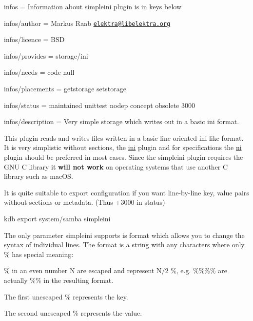 
\begin{DoxyItemize}
\item infos = Information about simpleini plugin is in keys below
\item infos/author = Markus Raab \href{mailto:elektra@libelektra.org}{\tt elektra@libelektra.\+org}
\item infos/licence = B\+SD
\item infos/provides = storage/ini
\item infos/needs = code null
\item infos/placements = getstorage setstorage
\item infos/status = maintained unittest nodep concept obsolete 3000
\item infos/description = Very simple storage which writes out in a basic ini format.
\end{DoxyItemize}

This plugin reads and writes files written in a basic line-\/oriented ini-\/like format. It is very simplistic without sections, the \hyperlink{autotoc_md289_src_plugins_ini_README_md}{ini} plugin and for specifications the \hyperlink{autotoc_md502_src_plugins_ni_README_md}{ni} plugin should be preferred in most cases. Since the {\ttfamily simpleini} plugin requires the G\+NU C library it {\bfseries will not work} on operating systems that use another C library such as mac\+OS.

It is quite suitable to export configuration if you want line-\/by-\/line key, value pairs without sections or metadata. (Thus +3000 in status)


\begin{DoxyCode}
kdb export system/samba simpleini
\end{DoxyCode}


The only parameter simpleini supports is {\ttfamily format} which allows you to change the syntax of individual lines. The {\ttfamily format} is a string with any characters where only {\ttfamily \%} has special meaning\+:


\begin{DoxyItemize}
\item {\ttfamily \%} in an even number N are escaped and represent N/2 {\ttfamily \%}, e.\+g. {\ttfamily \%\%\%\%} are actually {\ttfamily \%\%} in the resulting format.
\item The first unescaped {\ttfamily \%} represents the key.
\item The second unescaped {\ttfamily \%} represents the value.
\end{DoxyItemize}

